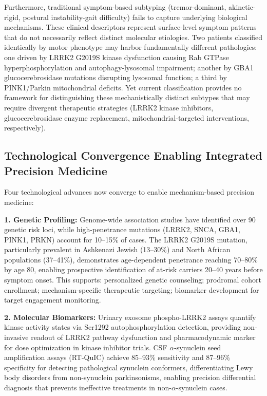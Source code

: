 \documentclass[11pt]{article}
\begin{document}
Furthermore, traditional symptom-based subtyping (tremor-dominant, akinetic-rigid, postural instability-gait difficulty)\cite{jankovic1990variable} fails to capture underlying biological mechanisms. These clinical descriptors represent surface-level symptom patterns that do not necessarily reflect distinct molecular etiologies. Two patients classified identically by motor phenotype may harbor fundamentally different pathologies: one driven by LRRK2 G2019S kinase dysfunction causing Rab GTPase hyperphosphorylation and autophagy-lysosomal impairment\cite{west2023lrrk2,steger2016phosphoproteomics}; another by GBA1 glucocerebrosidase mutations disrupting lysosomal function; a third by PINK1/Parkin mitochondrial deficits. Yet current classification provides no framework for distinguishing these mechanistically distinct subtypes that may require divergent therapeutic strategies (LRRK2 kinase inhibitors, glucocerebrosidase enzyme replacement, mitochondrial-targeted interventions, respectively).

\subsection*{Technological Convergence Enabling Integrated Precision Medicine}

Four technological advances now converge to enable mechanism-based precision medicine:

\textbf{1. Genetic Profiling:} Genome-wide association studies have identified over 90 genetic risk loci\cite{nalls2019identification}, while high-penetrance mutations (LRRK2, SNCA, GBA1, PINK1, PRKN) account for 10--15\% of cases. The LRRK2 G2019S mutation, particularly prevalent in Ashkenazi Jewish (13--30\%) and North African populations (37--41\%), demonstrates age-dependent penetrance reaching 70--80\% by age 80, enabling prospective identification of at-risk carriers 20--40 years before symptom onset\cite{marder2015age,west2023lrrk2}. This supports: personalized genetic counseling; prodromal cohort enrollment; mechanism-specific therapeutic targeting; biomarker development for target engagement monitoring\cite{simuni2024lrrk2}.

\textbf{2. Molecular Biomarkers:} Urinary exosome phospho-LRRK2 assays quantify kinase activity states via Ser1292 autophosphorylation detection, providing non-invasive readout of LRRK2 pathway dysfunction and pharmacodynamic marker for dose optimization in kinase inhibitor trials\cite{fraser2016ser,west2023lrrk2}. CSF $\alpha$-synuclein seed amplification assays (RT-QuIC) achieve 85--93\% sensitivity and 87--96\% specificity for detecting pathological synuclein conformers, differentiating Lewy body disorders from non-synuclein parkinsonisms\cite{siderowf2023csf,concha2024alpha,iranzo2021rbd}, enabling precision differential diagnosis that prevents ineffective treatments in non-$\alpha$-synuclein cases.
\end{document}
